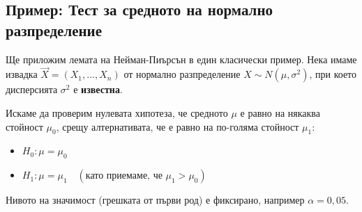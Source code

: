 \documentclass{article}
\begin{document}
\subsection{Пример: Тест за средното на нормално разпределение}
Ще приложим лемата на Нейман-Пиърсън в един класически пример. Нека имаме извадка $\vec{X} = (X_1, \dots, X_n)$ от нормално разпределение $X \sim N(\mu, \sigma^2)$, при което дисперсията $\sigma^2$ е \textbf{известна}. 

Искаме да проверим нулевата хипотеза, че средното $\mu$ е равно на някаква стойност $\mu_0$, срещу алтернативата, че е равно на по-голяма стойност $\mu_1$:
\begin{itemize}
    \item $H_0: \mu = \mu_0$
    \item $H_1: \mu = \mu_1 \quad (\text{като приемаме, че } \mu_1 > \mu_0)$
\end{itemize}
Нивото на значимост (грешката от първи род) е фиксирано, например $\alpha = 0,05$.
\end{document}
